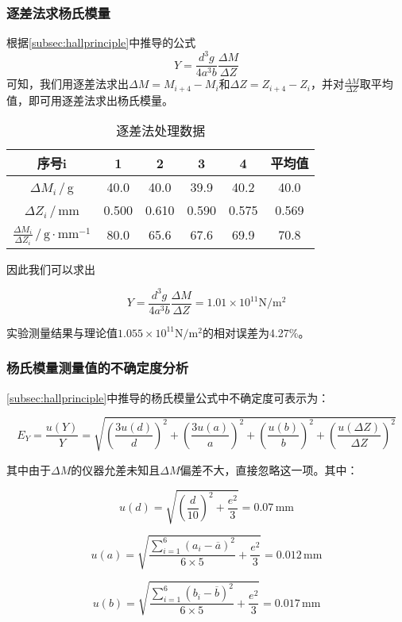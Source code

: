 \documentclass[12pt]{article}
\begin{document}
\subsubsection{逐差法求杨氏模量}
根据\ref{subsec:hallprinciple}中推导的公式
\[
    Y=\frac{d^3g}{4a^3b}\frac{\Delta M}{\Delta Z}
\]
可知，我们用逐差法求出$\Delta M=M_{i+4}-M_{i}$和$\Delta Z=Z_{i+4}-Z_{i}$，并对$\frac{\Delta M}{\Delta Z}$取平均值，即可用逐差法求出杨氏模量。

\begin{table}[htbp]
    \centering
    \begin{tabular}{|c|c|c|c|c|c|}
        \hline
        序号i & 1 & 2 & 3 & 4 & 平均值 \\
        \hline
        $\Delta M_i$\,/\,g & 40.0 & 40.0 & 39.9 & 40.2 & 40.0 \\
        \hline
        $\Delta Z_i$\,/\,mm & 0.500 & 0.610 & 0.590 & 0.575 & 0.569 \\
        \hline
        $\frac{\Delta M_i}{\Delta Z_i}$\,/\,$\mathrm{g\cdot mm^{-1}}$ & 80.0 & 65.6 & 67.6 & 69.9 & 70.8 \\
        \hline
    \end{tabular}
    \caption{逐差法处理数据}
\end{table}

因此我们可以求出

\[
    Y=\frac{d^3g}{4a^3b}\frac{\Delta M}{\Delta Z}=1.01\times10^{11}\mathrm{N/m^2}
\]

实验测量结果与理论值$1.055\times10^{11}\mathrm{N/m^2}$的相对误差为4.27\%。

\subsubsection{杨氏模量测量值的不确定度分析}\label{subsubsec:analysis1}
\ref{subsec:hallprinciple}中推导的杨氏模量公式中不确定度可表示为：

\[
    E_Y=\frac{u(Y)}{Y}=\sqrt{\left(\frac{3u(d)}{d}\right)^2+\left(\frac{3u(a)}{a}\right)^2+\left(\frac{u(b)}{b}\right)^2+\left(\frac{u(\Delta Z)}{\Delta Z}\right)^2}
\]

其中由于$\Delta M$的仪器允差未知且$\Delta M$偏差不大，直接忽略这一项。其中：

\[
    u(d)=\sqrt{\left(\frac{d}{10}\right)^2+\frac{e^2}{3}}=0.07\,\mathrm{mm}
\]

\[
    u(a)=\sqrt{\frac{\sum_{i=1}^{6}(a_i-\overline{a})^2}{6\times5}+\frac{e^2}{3}}=0.012\,\mathrm{mm}
\]

\[
    u(b)=\sqrt{\frac{\sum_{i=1}^{6}(b_i-\overline{b})^2}{6\times5}+\frac{e^2}{3}}=0.017\,\mathrm{mm}
\]
\end{document}
